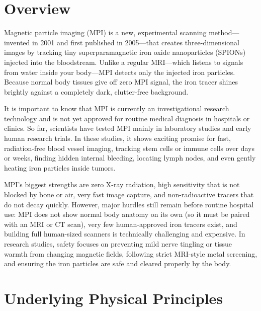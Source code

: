 \label{ch:infographic-mpi}

\section{Overview}

Magnetic particle imaging (MPI) is a new, experimental scanning method---invented in 2001 and first published in 2005---that creates three-dimensional images by tracking tiny superparamagnetic iron oxide nanoparticles (SPIONs) injected into the bloodstream. Unlike a regular MRI---which listens to signals from water inside your body---MPI detects only the injected iron particles. Because normal body tissues give off zero MPI signal, the iron tracer shines brightly against a completely dark, clutter-free background.

It is important to know that MPI is currently an investigational research technology and is not yet approved for routine medical diagnosis in hospitals or clinics. So far, scientists have tested MPI mainly in laboratory studies and early human research trials. In these studies, it shows exciting promise for fast, radiation-free blood vessel imaging, tracking stem cells or immune cells over days or weeks, finding hidden internal bleeding, locating lymph nodes, and even gently heating iron particles inside tumors.

MPI's biggest strengths are zero X-ray radiation, high sensitivity that is not blocked by bone or air, very fast image capture, and non-radioactive tracers that do not decay quickly. However, major hurdles still remain before routine hospital use: MPI does not show normal body anatomy on its own (so it must be paired with an MRI or CT scan), very few human-approved iron tracers exist, and building full human-sized scanners is technically challenging and expensive. In research studies, safety focuses on preventing mild nerve tingling or tissue warmth from changing magnetic fields, following strict MRI-style metal screening, and ensuring the iron particles are safe and cleared properly by the body.

\section{Underlying Physical Principles}

